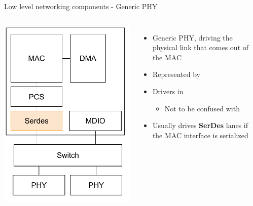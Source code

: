 \begin{frame}{Low level networking components - Generic PHY}
	\begin{columns}
			\includegraphics[width=\textwidth]{slides/networking-driver-overview/net_components_serdes.pdf}
		\begin{itemize}
			\item Generic PHY, driving the physical link that comes out of the MAC
			\item Represented by 
			\item Drivers in 
				\begin{itemize}
					\item Not to be confused with 
				\end{itemize}
			\item Usually drives \textbf{SerDes} lanes if the MAC interface is serialized

\end{itemize}
\end{columns}
\end{frame}
